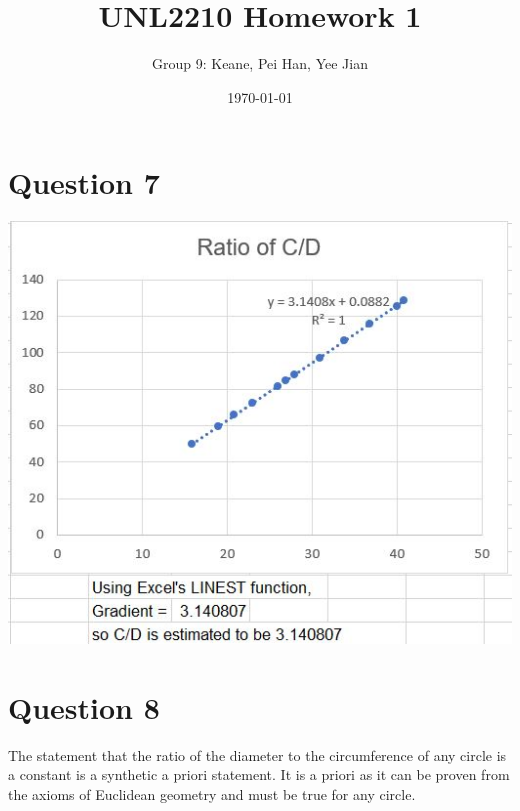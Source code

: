 \documentclass{article}
\title{UNL2210 Homework 1}
\author{Group 9: Keane, Pei Han, Yee Jian}
\date{\today}
\begin{document}
\maketitle
\section*{Question 7}
\datatable

\begin{centering}
\includegraphics{bfl.jpg}
\end{centering}
\section*{Question 8}
The statement that the ratio of the diameter to the circumference of any circle
is a constant is a synthetic a priori statement. It is a priori as it can be
proven from the axioms of Euclidean geometry and must be true for any circle.
\end{document}
